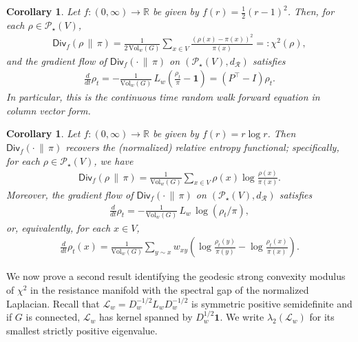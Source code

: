 \documentclass[11pt,a4paper]{article}
\newcommand{\Resis}{\mathcal{R}}
\newcommand{\Div}{\mathsf{Div}}
\newcommand{\Prob}{\mathscr{P}}
\newcommand{\Vol}{\mathrm{Vol}}
\newtheorem{corollary}[theorem]{Corollary}
\begin{document}
\begin{corollary}\label{cor:chi2-fdiv}
    Let $f:(0,\infty)\to\mathbb{R}$ be given by $f(r)=\frac{1}{2}(r-1)^2$. Then, for each $\rho\in\Prob_\star(V)$,
        \begin{align*}
            \Div_f(\rho\,\|\,\pi)
            = \frac{1}{2\,\Vol_w(G)}\sum_{x\in V} \frac{(\rho(x)-\pi(x))^2}{\pi(x)}
            =: \chi^2(\rho),
        \end{align*}
    and the gradient flow of $\Div_f(\cdot\,\|\,\pi)$ on $(\Prob_\star(V),d_\Resis)$ satisfies
        \begin{align*}
            \frac{d}{dt}\rho_t
            = -\frac{1}{\Vol_w(G)}\,L_w\left(\frac{\rho_t}{\pi}-\mathbf{1}\right)
            = (P^\top-I)\rho_t.
        \end{align*}
    In particular, this is the continuous time random walk forward equation in column vector form.
\end{corollary}

\begin{corollary}\label{cor:entropy-fdiv}
    Let $f:(0,\infty)\to\mathbb{R}$ be given by $f(r)=r\log r$. Then $\Div_f(\cdot\,\|\,\pi)$ recovers the (normalized) relative entropy functional; specifically, for each $\rho\in\Prob_\star(V)$, we have
        \begin{align*}
            \Div_f(\rho\,\|\,\pi)
            = \frac{1}{\Vol_w(G)}\sum_{x\in V} \rho(x)\log\frac{\rho(x)}{\pi(x)}.
        \end{align*}
    Moreover, the gradient flow of $\Div_f(\cdot\,\|\,\pi)$ on $(\Prob_\star(V),d_\Resis)$ satisfies
        \begin{align*}
            \frac{d}{dt}\rho_t
            = -\frac{1}{\Vol_w(G)}\,L_w\,\log\left(\rho_t/\pi\right),
        \end{align*}
    or, equivalently, for each $x\in V$,
        \begin{align*}
            \frac{d}{dt}\rho_t(x)
            = \frac{1}{\Vol_w(G)}\sum_{y\sim x} w_{xy}\left(
            \log\frac{\rho_t(y)}{\pi(y)}-\log\frac{\rho_t(x)}{\pi(x)}\right).
        \end{align*}
\end{corollary}

We now prove a second result identifying the geodesic strong convexity modulus of $\chi^2$ in the resistance manifold with the spectral gap of the normalized Laplacian. Recall that $\mathcal{L}_w = D_w^{-1/2}L_w D_w^{-1/2}$ is symmetric positive semidefinite and if $G$ is connected, $\mathcal{L}_{w}$ has kernel spanned by $D_w^{1/2}\mathbf{1}$. We write $\lambda_2(\mathcal{L}_w)$ for its smallest strictly positive eigenvalue.
\end{document}
